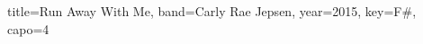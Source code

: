 \documentclass{../../tex/bekki-leadsheet}
\begin{document}
\begin{song}[transpose-capo=true]{title={Run Away With Me}, band={Carly Rae Jepsen}, year={2015}, key={F#}, capo={4}}

    

\end{song}
\end{document}
